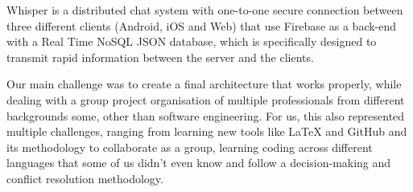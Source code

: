 Whisper is a distributed chat system with one-to-one secure connection between three different clients (Android, iOS and Web) that use Firebase as a back-end with a Real Time NoSQL JSON database, which is specifically designed to transmit rapid information between the server and the clients.

Our main challenge was to create a final architecture that works properly, while dealing with a group project organisation of multiple professionals from different backgrounds some, other than software engineering. For us, this also represented multiple challenges, ranging from learning new tools like \LaTeX{} and GitHub and its methodology to collaborate as a group, learning coding across different languages that some of us didn't even know and follow a decision-making and conflict resolution methodology.















